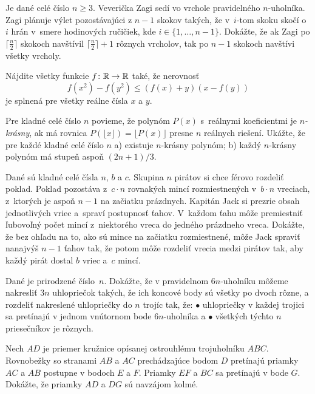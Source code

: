 {%
Je dané celé číslo $n\ge3$. Veverička Zagi sedí vo vrchole pravidelného $n$-uholníka. Zagi plánuje výlet pozostávajúci z $n-1$ skokov takých, že v~$i$-tom skoku skočí o~$i$ hrán v~smere hodinových ručičiek, kde $i\in \{1,\dots,n-1\}$. Dokážte, že ak Zagi po $\lceil{\frac n2}\rceil$ skokoch navštívil $\lceil{\frac n2}\rceil+1$ rôznych vrcholov, tak po $n-1$ skokoch navštívi všetky vrcholy.}

{%
Nájdite všetky funkcie $f\colon\Bbb R\to\Bbb R$ také, že nerovnosť
$$
f(x^2)-f(y^2)\le (f(x)+y)(x-f(y))
$$
je splnená pre všetky reálne čísla $x$ a $y$.
}

{%
Pre kladné celé číslo $n$ povieme, že polynóm $P(x)$ s~reálnymi koeficientmi je \emph{$n$-krásny}, ak má rovnica $P(\lfloor x \rfloor) = \lfloor P(x) \rfloor$ presne $n$ reálnych riešení. Ukážte, že pre každé kladné celé číslo $n$
\ite a) existuje $n$-krásny polynóm;
\ite b) každý $n$-krásny polynóm má stupeň aspoň $(2n+1)/3$.}

{%
Dané sú kladné celé čísla $n$, $b$ a $c$. Skupina $n$ pirátov si chce férovo rozdeliť poklad. Poklad pozostáva z~$c \cdot n$ rovnakých mincí rozmiestnených v~$b \cdot n$ vreciach, z~ktorých je aspoň $n-1$ na začiatku prázdnych. Kapitán Jack si prezrie obsah jednotlivých vriec a~spraví postupnosť ťahov. V~každom ťahu môže premiestniť ľubovoľný počet mincí z~niektorého vreca do jedného prázdneho vreca. Dokážte, že bez ohľadu na to, ako sú mince na začiatku rozmiestnené, môže Jack spraviť nanajvýš $n-1$ ťahov tak, že potom môže rozdeliť vrecia medzi pirátov tak, aby každý pirát dostal $b$ vriec a~$c$ mincí.}

{%
Dané je prirodzené číslo~$n$. Dokážte, že v pravidelnom $6n$-uholníku môžeme nakresliť $3n$ uhlopriečok takých, že ich koncové body sú všetky po dvoch rôzne, a rozdeliť nakreslené uhlopriečky do $n$ trojíc tak, že:
\ite $\bullet$ uhlopriečky v každej trojici sa pretínajú v jednom vnútornom bode $6n$-uholníka a
\ite $\bullet$ všetkých týchto $n$ priesečníkov je rôznych.\endgraf
}

{%
Nech $AD$ je priemer kružnice opísanej ostrouhlému trojuholníku $ABC$. Rovnobežky so stranami $AB$ a $AC$ prechádzajúce bodom $D$ pretínajú priamky $AC$ a $AB$ postupne v bodoch $E$ a $F$. Priamky $EF$ a $BC$ sa pretínajú v bode $G$. Dokážte, že priamky $AD$ a $DG$ sú navzájom kolmé.}

